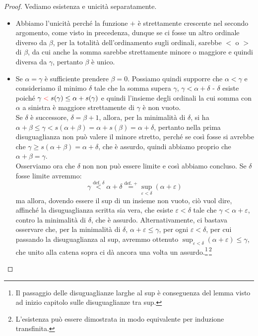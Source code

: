 \begin{proof}
	Vediamo esistenza e unicit\`a separatamente.
	\begin{itemize}
		\item[$\boxed{\text{unicit\`a}}$] Abbiamo l'unicit\`a perch\'e la funzione $+$ \`e strettamente crescente nel secondo argomento, come visto in precedenza, dunque se ci fosse un altro ordinale diverso da $\beta$, per la totalit\`a dell'ordinamento sugli
		ordinali, sarebbe $<$ o $>$ di $\beta$, da cui anche la somma sarebbe strettamente minore o maggiore e quindi diversa da $\gamma$, pertanto $\beta$ \`e unico.
		\item[$\boxed{\text{esistenza}}$] Se $\alpha = \gamma$ \`e sufficiente prendere $\beta = 0$. Possiamo quindi supporre che $\alpha < \gamma$ e consideriamo
		il minimo $\delta$ tale che la somma supera $\gamma$, $\gamma < \alpha + \delta$ - $\delta$ esiste poich\'e $\gamma \;\textcolor{red}{<}\; s(\gamma) \leq \alpha + s(\gamma)$ e quindi l'insieme degli ordinali la cui somma con $\alpha$ a sinistra \`e maggiore strettamente di $\gamma$ \`e non vuoto.\\
		Se $\delta$ \`e successore, $\delta = \beta + 1$, allora, per la minimalit\`a di $\delta$, si ha $\alpha + \beta \leq \gamma < s(\alpha + \beta) = \alpha + s(\beta) = \alpha + \delta$, pertanto nella prima disuguaglianza non pu\`o valere il minore stretto, perch\'e se cos\`i fosse si avrebbe che $\gamma \geq s(\alpha + \beta) = \alpha + \delta$, che \`e assurdo, 
		quindi abbiamo proprio che $\alpha + \beta = \gamma$.\\
		Osserviamo ora che $\delta$ non non pu\`o essere limite e cos\`i abbiamo concluso. Se $\delta$ fosse limite avremmo:
		\[ \gamma \overset{\text{def. $\delta$}}{<} \alpha + \delta \overset{\text{def. +}}{=} \sup_{\varepsilon < \delta}(\alpha + \varepsilon)
			\] 
		ma allora, dovendo essere il sup di un insieme non vuoto, ci\`o vuol dire, affinch\'e la disuguaglianza scritta sia vera, che esiste $\varepsilon < \delta$ tale che $\gamma < \alpha + \varepsilon$, contro la minimalit\`a di $\delta$, che \`e assurdo. Alternativamente,
		ci bastava osservare che, per la minimalit\`a di $\delta$, $\alpha + \varepsilon \leq \gamma$, per ogni $\varepsilon < \delta$, per cui passando la disuguaglianza al sup, avremmo ottenuto $\sup_{\varepsilon < \delta}(\alpha + \varepsilon) \leq \gamma$, che unito alla catena sopra ci d\`a ancora una volta un assurdo.\footnote{Il passaggio delle disuguaglianze larghe al sup \`e conseguenza del lemma visto ad inizio capitolo sulle disuguaglianze tra sup.}\,\footnote{L'esistenza pu\`o essere dimostrata in modo equivalente per induzione transfinita.}
	\end{itemize}
\end{proof}

